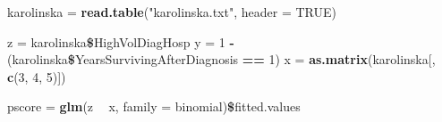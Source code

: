 \documentclass[]{article}
\newenvironment{Shaded}{\begin{snugshade}}{\end{snugshade}}
\newcommand{\KeywordTok}[1]{\textcolor[rgb]{0.13,0.29,0.53}{\textbf{#1}}}
\newcommand{\DataTypeTok}[1]{\textcolor[rgb]{0.13,0.29,0.53}{#1}}
\newcommand{\DecValTok}[1]{\textcolor[rgb]{0.00,0.00,0.81}{#1}}
\newcommand{\StringTok}[1]{\textcolor[rgb]{0.31,0.60,0.02}{#1}}
\newcommand{\OtherTok}[1]{\textcolor[rgb]{0.56,0.35,0.01}{#1}}
\newcommand{\OperatorTok}[1]{\textcolor[rgb]{0.81,0.36,0.00}{\textbf{#1}}}
\newcommand{\NormalTok}[1]{#1}
\begin{document}
\begin{Shaded}
\begin{Highlighting}[]
\NormalTok{karolinska =}\StringTok{ }\KeywordTok{read.table}\NormalTok{(}\StringTok{"karolinska.txt"}\NormalTok{, }\DataTypeTok{header =} \OtherTok{TRUE}\NormalTok{)}

\NormalTok{z =}\StringTok{ }\NormalTok{karolinska}\OperatorTok{\$}\NormalTok{HighVolDiagHosp}
\NormalTok{y =}\StringTok{ }\DecValTok{1} \OperatorTok{-}\StringTok{ }\NormalTok{(karolinska}\OperatorTok{\$}\NormalTok{YearsSurvivingAfterDiagnosis }\OperatorTok{==}\StringTok{ }\DecValTok{1}\NormalTok{)}
\NormalTok{x =}\StringTok{ }\KeywordTok{as.matrix}\NormalTok{(karolinska[, }\KeywordTok{c}\NormalTok{(}\DecValTok{3}\NormalTok{, }\DecValTok{4}\NormalTok{, }\DecValTok{5}\NormalTok{)])}

\NormalTok{pscore =}\StringTok{ }\KeywordTok{glm}\NormalTok{(z }\OperatorTok{~}\StringTok{ }\NormalTok{x, }\DataTypeTok{family =}\NormalTok{ binomial)}\OperatorTok{\$}\NormalTok{fitted.values}


\end{Highlighting}
\end{Shaded}
\end{document}
